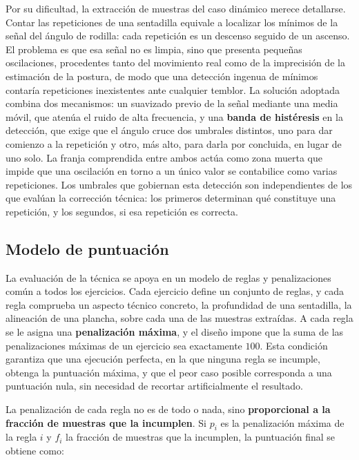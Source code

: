 \documentclass[12pt,a4paper,twoside,openright]{book}
\begin{document}
    Por su dificultad, la extracción de muestras del caso dinámico merece
    detallarse. Contar las repeticiones de una sentadilla equivale a localizar
    los mínimos de la señal del ángulo de rodilla: cada repetición es un descenso
    seguido de un ascenso. El problema es que esa señal no es limpia, sino que
    presenta pequeñas oscilaciones, procedentes tanto del movimiento real como
    de la imprecisión de la estimación de la postura, de modo que una detección
    ingenua de mínimos contaría repeticiones inexistentes ante cualquier temblor.
    La solución adoptada combina dos mecanismos: un suavizado previo de la señal
    mediante una media móvil, que atenúa el ruido de alta frecuencia, y una
    \textbf{banda de histéresis} en la detección, que exige que el ángulo cruce
    dos umbrales distintos, uno para dar comienzo a la repetición y otro,
    más alto, para darla por concluida, en lugar de uno solo. La franja
    comprendida entre ambos actúa como zona muerta que impide que una oscilación
    en torno a un único valor se contabilice como varias repeticiones. Los
    umbrales que gobiernan esta detección son independientes de los que evalúan
    la corrección técnica: los primeros determinan qué constituye una
    repetición, y los segundos, si esa repetición es correcta.

    \subsection{Modelo de puntuación}

    La evaluación de la técnica se apoya en un modelo de reglas y penalizaciones
    común a todos los ejercicios. Cada ejercicio define un conjunto de reglas, y
    cada regla comprueba un aspecto técnico concreto, la profundidad de una
    sentadilla, la alineación de una plancha, sobre cada una de las muestras
    extraídas. A cada regla se le asigna una \textbf{penalización máxima}, y el
    diseño impone que la suma de las penalizaciones máximas de un ejercicio sea
    exactamente $100$. Esta condición garantiza que una ejecución perfecta, en la
    que ninguna regla se incumple, obtenga la puntuación máxima, y que el peor
    caso posible corresponda a una puntuación nula, sin necesidad de recortar
    artificialmente el resultado.

    La penalización de cada regla no es de todo o nada, sino \textbf{proporcional
    a la fracción de muestras que la incumplen}. Si $p_i$ es la penalización
    máxima de la regla $i$ y $f_i$ la fracción de muestras que la incumplen, la
    puntuación final se obtiene como:
\end{document}
